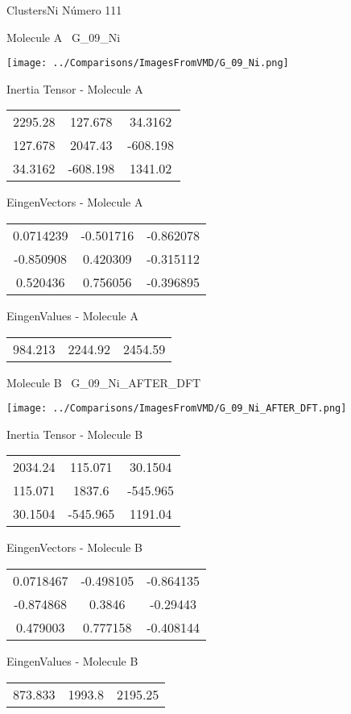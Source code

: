 \newpage

\vtab[-3cm]
\begin{center}
{\large ClustersNi \tab Número 111}
\end{center}
\begin{multicols}{2}
\begin{center}

Molecule A \
G\_09\_Ni

\texttt{[image: ../Comparisons/ImagesFromVMD/G\_09\_Ni.png]}

Inertia Tensor - Molecule A \\
\begin{tabular}{|c c c|}
2295.28	 & 	127.678	 & 	34.3162	 \\
127.678	 & 	2047.43	 & 	-608.198	 \\
34.3162	 & 	-608.198	 & 	1341.02
\end{tabular}

\vtab
 EingenVectors - Molecule A     \\
\begin{tabular}{|c c c|}
0.0714239	 & 	-0.501716	 & 	-0.862078	 \\
-0.850908	 & 	0.420309	 & 	-0.315112	 \\
0.520436	 & 	0.756056	 & 	-0.396895
\end{tabular}

\vtab
 EingenValues - Molecule A     \\
\begin{tabular}{|c c c|}
984.213	 & 	2244.92	 & 	2454.59	 \\
\end{tabular}
\columnbreak

Molecule B \
G\_09\_Ni\_AFTER\_DFT

\texttt{[image: ../Comparisons/ImagesFromVMD/G\_09\_Ni\_AFTER\_DFT.png]}

Inertia Tensor - Molecule B \\
\begin{tabular}{|c c c|}
2034.24	 & 	115.071	 & 	30.1504	 \\
115.071	 & 	1837.6	 & 	-545.965	 \\
30.1504	 & 	-545.965	 & 	1191.04
\end{tabular}

\vtab
 EingenVectors - Molecule B     \\
\begin{tabular}{|c c c|}
0.0718467	 & 	-0.498105	 & 	-0.864135	 \\
-0.874868	 & 	0.3846	 & 	-0.29443	 \\
0.479003	 & 	0.777158	 & 	-0.408144
\end{tabular}

\vtab
 EingenValues - Molecule B     \\
\begin{tabular}{|c c c|}
873.833	 & 	1993.8	 & 	2195.25	 \\
\end{tabular}

\end{center}
\end{multicols}

